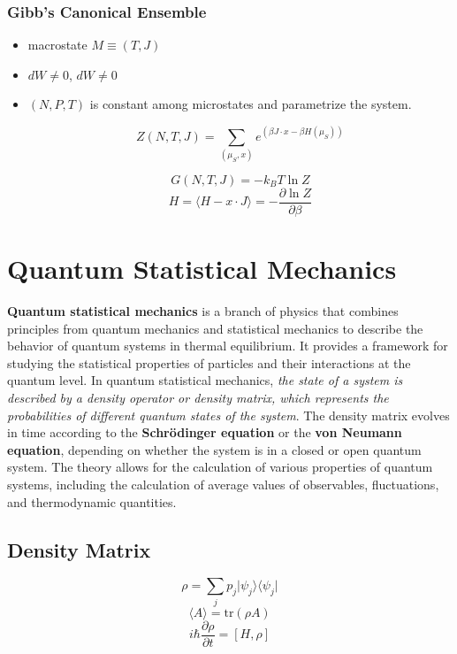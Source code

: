 \documentclass{article}
\begin{document}
\subsubsection{Gibb's Canonical Ensemble}
\begin{itemize}
    \item macrostate $M \equiv (T, J)
$
\item $dW \neq 0$, $dW \neq 0$
\item $(N, P, T)$ is constant among microstates and parametrize the system.

$$Z(N, T, J) = \sum_{(\mu_S, x)} e^{\left(\beta J \cdot x - \beta H(\mu_S)\right)}$$

$$G(N, T, J) = -k_BT \ln Z$$
$$H = \langle H - x \cdot J \rangle = -\frac{\partial \ln Z}{\partial \beta}$$



\end{itemize}




\section{Quantum Statistical Mechanics}

\textbf{Quantum statistical mechanics} is a branch of physics that combines principles from quantum mechanics and statistical mechanics to describe the behavior of quantum systems in thermal equilibrium. It provides a framework for studying the statistical properties of particles and their interactions at the quantum level.
In quantum statistical mechanics, \textit{the state of a system is described by a density operator or density matrix, which represents the probabilities of different quantum states of the system}. The density matrix evolves in time according to the \textbf{Schrödinger equation} or the \textbf{von Neumann equation}, depending on whether the system is in a closed or open quantum system.
The theory allows for the calculation of various properties of quantum systems, including the calculation of average values of observables, fluctuations, and thermodynamic quantities. 

\subsection{Density Matrix}
\large
$$\rho = \sum_{j} p_j \vert \psi_j \rangle \langle \psi_j \vert$$
$$\langle A \rangle = \text{tr}(\rho A)$$
$$i\hbar \frac{{\partial \rho}}{{\partial t}} = [H, \rho] $$
\end{document}

